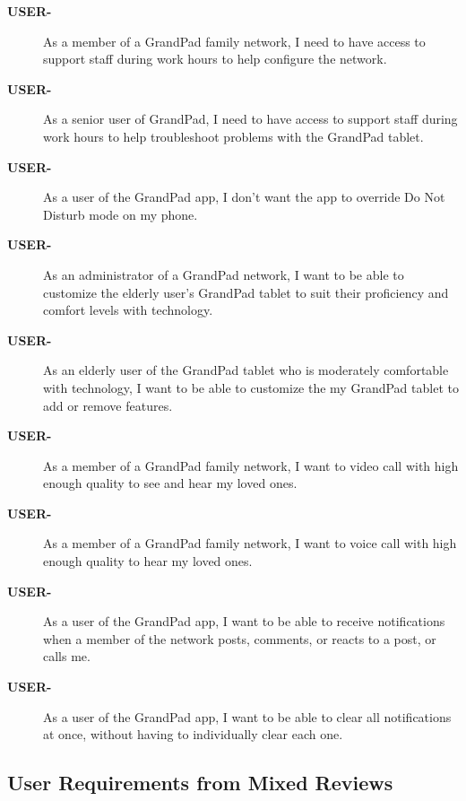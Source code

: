 \begin{description}
    \item[\textbf{USER-\showmycounter}]
        As a member of a GrandPad family network, I need to have access to
            support staff during work hours to help configure the network.
    \item[\textbf{USER-\showmycounter}]
        As a senior user of GrandPad, I need to have access to support staff
            during work hours to help troubleshoot problems with the GrandPad
            tablet.
    \item[\textbf{USER-\showmycounter}]
        As a user of the GrandPad app, I don't want the app to override
            Do Not Disturb mode on my phone.
    \item[\textbf{USER-\showmycounter}]
        As an administrator of a GrandPad network, I want to be able to
            customize the elderly user's GrandPad tablet to suit their
            proficiency and comfort levels with technology.
    \item[\textbf{USER-\showmycounter}]
        As an elderly user of the GrandPad tablet who is moderately comfortable
            with technology, I want to be able to customize the my GrandPad
            tablet to add or remove features.
    \item[\textbf{USER-\showmycounter}]
        As a member of a GrandPad family network, I want to video call with high
            enough quality to see and hear my loved ones.
    \item[\textbf{USER-\showmycounter}]
        As a member of a GrandPad family network, I want to voice call with high
            enough quality to hear my loved ones.
    \item[\textbf{USER-\showmycounter}]
        As a user of the GrandPad app, I want to be able to receive
            notifications when a member of the network posts, comments, or
            reacts to a post, or calls me.
    \item[\textbf{USER-\showmycounter}]
        As a user of the GrandPad app, I want to be able to clear all
            notifications at once, without having to individually clear each
            one.
\end{description}

\subsection*{User Requirements from Mixed Reviews}


